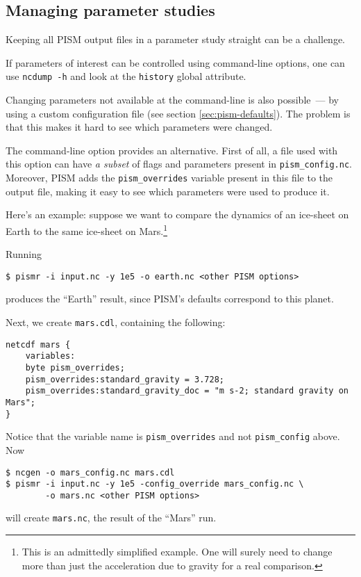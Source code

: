 \subsection{Managing parameter studies}
\label{sec:parameter-studies}
Keeping all PISM output files in a parameter study straight can be a challenge.

If parameters of interest can be controlled using command-line options, one can use \texttt{ncdump -h} and look at the \texttt{history} global attribute.

Changing parameters not available at the command-line is also possible~--- by using a custom configuration file (see section \ref{sec:pism-defaults}). The problem is that this makes it hard to see which parameters were changed.

The  command-line option provides an alternative. First of all, a file used with this option can have \emph{a subset} of flags and parameters present in \texttt{pism_config.nc}. Moreover, PISM adds the \texttt{pism_overrides} variable present in this file to the output file, making it easy to see which parameters were used to produce it.

Here's an example: suppose we want to compare the dynamics of an ice-sheet on Earth to the same ice-sheet on Mars.\footnote{This is an admittedly simplified example. One will surely need to change more than just the acceleration due to gravity for a real comparison.}

Running
\begin{verbatim}
$ pismr -i input.nc -y 1e5 -o earth.nc <other PISM options>
\end{verbatim}
produces the ``Earth'' result, since PISM's defaults correspond to this planet.

Next, we create \texttt{mars.cdl}, containing the following:
\small
\begin{verbatim}
netcdf mars {
    variables:
    byte pism_overrides;
    pism_overrides:standard_gravity = 3.728;
    pism_overrides:standard_gravity_doc = "m s-2; standard gravity on Mars";
}
\end{verbatim}
\normalsize
Notice that the variable name is \texttt{pism_overrides} and not \texttt{pism_config} above. Now
\begin{verbatim}
$ ncgen -o mars_config.nc mars.cdl
$ pismr -i input.nc -y 1e5 -config_override mars_config.nc \
        -o mars.nc <other PISM options>
\end{verbatim}
will create \texttt{mars.nc}, the result of the ``Mars'' run.

